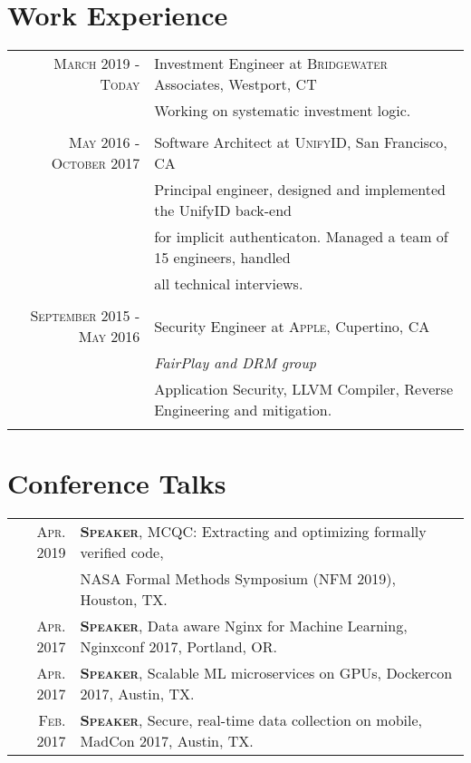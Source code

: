 \documentclass[lettersize,11pt]{article}
\begin{document}
\section{Work Experience}
\begin{tabular}{rl}
\textsc{March 2019 - Today} & Investment Engineer at \textsc{Bridgewater} Associates, Westport, CT\\
&\footnotesize{Working on systematic investment logic.}\\\multicolumn{2}{c}{} \\

\textsc{May 2016 - October 2017} & Software Architect at \textsc{UnifyID}, San Francisco, CA\\
&\footnotesize{Principal engineer, designed and implemented the UnifyID back-end}\\
&\footnotesize{for implicit authenticaton. Managed a team of 15 engineers, handled}\\
&\footnotesize{all technical interviews.}\\\multicolumn{2}{c}{} \\

\textsc{September 2015 - May 2016} & Security Engineer at \textsc{Apple}, Cupertino, CA \\&\emph{FairPlay and DRM group}\\
&\footnotesize{Application Security, LLVM Compiler, Reverse Engineering and mitigation.} \\\multicolumn{2}{c}{} \\
\end{tabular}


\section{Conference Talks}
\begin{tabular}{rl}
    \textsc{Apr.} 2019 & \textsc{\textbf{Speaker}}, MCQC: Extracting and optimizing formally verified code, \\
     &                                              NASA Formal Methods Symposium (NFM 2019), Houston, TX. \\
    \textsc{Apr.} 2017 & \textsc{\textbf{Speaker}}, Data aware Nginx for Machine Learning, Nginxconf 2017, Portland, OR. \\
    \textsc{Apr.} 2017 & \textsc{\textbf{Speaker}}, Scalable ML microservices on GPUs, Dockercon 2017, Austin, TX. \\
    \textsc{Feb.} 2017 & \textsc{\textbf{Speaker}}, Secure, real-time data collection on mobile, MadCon 2017, Austin, TX. \\
\end{tabular}
\end{document}
